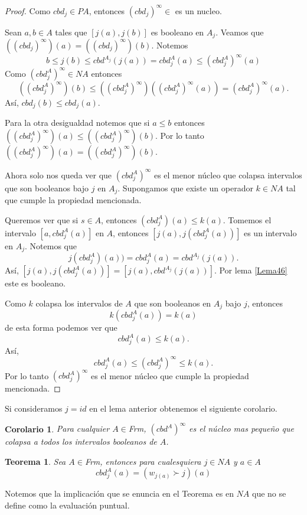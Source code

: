 \documentclass[12pt,letterpaper,titlepage]{article}
\newtheorem*{cor}{Corolario}
\newtheorem{thm}{Teorema}
\theoremstyle{definition}
\newcommand\<{\langle}
\renewcommand\>{\rangle}
\begin{document}
\begin{proof}
Como $cbd_j\in PA$, entonces $(cbd_j)^\infty\in$ es un nucleo.

\noindent
Sean $a,b\in A$ tales que $[j(a),j(b)]$ es booleano en $A_j$. Veamos que $((cbd_j)^\infty )(a)= ((cbd_j)^\infty )(b)$. Notemos $$b\leq j(b)\leq cbd^{A_j}(j(a))=cbd_j^A(a)\leq (cbd_j^A)^\infty (a)$$
Como $(cbd_j^A)^\infty\in NA$ entonces 
$$((cbd_j^A)^\infty )(b)\leq ((cbd_j^A)^\infty)((cbd_j^A)^\infty (a))= (cbd_j^A)^\infty (a).$$ 
Así, $cbd_j(b)\leq cbd_j(a)$.

\noindent
Para la otra desigualdad notemos que si $a\leq b$ entonces $((cbd_j^A)^\infty )(a)\leq ((cbd_j^A)^\infty )(b)$. Por lo tanto $((cbd_j^A)^\infty )(a)= ((cbd_j^A)^\infty )(b)$.

\noindent
Ahora solo nos queda ver que $(cbd_j^A)^\infty$ es el menor núcleo que colapsa intervalos que son booleanos bajo $j$ en $A_j$. Supongamos que existe un operador $k\in NA$ tal que cumple la propiedad mencionada.

\noindent
Queremos ver que si $s\in A$, entonces $(cbd_j^A)(a)\leq k(a)$. Tomemos el intervalo $[a,cbd_j^A(a)]$ en $A$, entonces $[j(a),j(cbd_j^A(a))]$ es un intervalo en $A_j$. Notemos que $$j(cbd_j^A)(a))=cbd_j^A(a)=cbd^{A_j}(j(a)).$$ 
Así, $[j(a), j(cbd_j^A(a))]=[j(a),cbd^{A_j}(j(a))]$. Por lema \ref{Lema46} este es booleano.

\noindent
Como $k$ colapsa los intervalos de $A$ que son booleanos en $A_j$ bajo $j$, entonces $$k(cbd_j^A(a))=k(a)$$
de esta forma podemos ver que $$cbd_j^A(a)\leq k(a).$$ 
Así, $$cbd_j^A(a)\leq (cbd_j^A)^\infty\leq k(a).$$
Por lo tanto $(cbd_j^A)^\infty$ es el menor núcleo que cumple la propiedad mencionada.
\end{proof}

Si consideramos $j=id$ en el lema anterior obtenemos el siguiente corolario.

\begin{cor}
Para cualquier $A\in$\textit{Frm}, $(cbd^A)^\infty$ es el núcleo mas pequeño que colapsa a todos los intervalos booleanos de $A$.
\end{cor}

\begin{thm}
Sea $A\in$\textit{Frm}, entonces para cualesquiera $j\in NA$ y $a\in A$ $$cbd_j^A(a)=(w_{j(a)}\succ j)(a)$$
\end{thm}
Notemos que la implicación que se enuncia en el Teorema es en $NA$ que no se define como la evaluación puntual.
\end{document}
